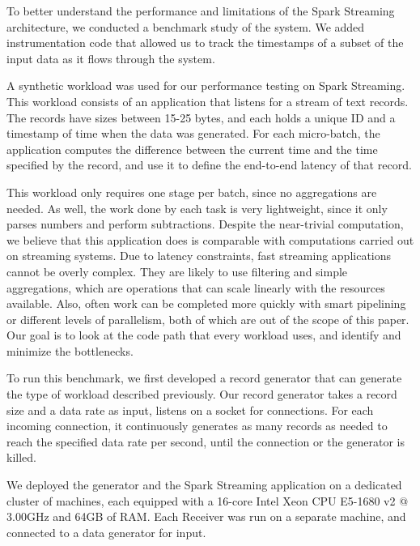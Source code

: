 To better understand the performance and limitations of the Spark Streaming architecture, we conducted a benchmark study of the system. We added instrumentation code that allowed us to track the timestamps of a subset of the input data as it flows through the system.

A synthetic workload was used for our performance testing on Spark Streaming.
This workload consists of an application that listens for a stream of text records.
The records have sizes between 15-25 bytes, and each holds a unique ID and a timestamp of time when the data was generated.
For each micro-batch, the application computes the difference between the current time and the time specified by the record, and use it to define the end-to-end latency of that record.

This workload only requires one stage per batch, since no aggregations are needed. As well, the work done by each task is very lightweight, since it only parses numbers and perform subtractions.
Despite the near-trivial computation, we believe that this application does is comparable with computations carried out on streaming systems. Due to latency constraints, fast streaming applications cannot be overly complex. They are likely to use filtering and simple aggregations, which are operations that can scale linearly with the resources available.
Also, often work can be completed more quickly with smart pipelining or different levels of parallelism, both of which are out of the scope of this paper. Our goal is to look at the code path that every workload uses, and identify and minimize the bottlenecks.


To run this benchmark, we first developed a record generator that can generate the type of workload described previously. Our record generator takes a record size and a data rate as input, listens on a socket for connections. For each incoming connection, it continuously generates as many records as needed to reach the specified data rate per second, until the connection or the generator is killed.

We deployed the generator and the Spark Streaming application on a dedicated cluster of machines, each equipped with a 16-core Intel Xeon CPU E5-1680 v2 @ 3.00GHz and 64GB of RAM. Each Receiver was run on a separate machine, and connected to a data generator for input.

